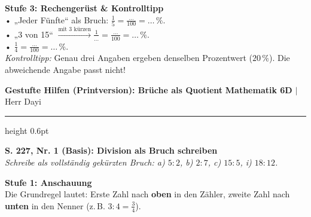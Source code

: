 \documentclass[a4paper,10pt]{article}
\begin{document}
\begin{tcolorbox}[colback=step3Bg, colframe=step3Border, arc=1.8mm, boxrule=0.7pt, left=3mm, right=3mm, top=1.8mm, bottom=1.8mm]
    {\color{step3Text}\small\bfseries\faCheckSquare\enskip Stufe 3: Rechengerüst \& Kontrolltipp}\\[1mm]
    {\footnotesize
    • „Jeder Fünfte“ als Bruch: $\frac{1}{5} = \frac{\dots}{100} = \dots\,\%$.\\
    • „3 von 15“ $\xrightarrow{\text{mit 3 kürzen}} \frac{1}{\dots} = \frac{\dots}{100} = \dots\,\%$.\\
    • $\frac{1}{4} = \frac{\dots}{100} = \dots\,\%$.\\[1mm]
    \textit{Kontrolltipp:} Genau drei Angaben ergeben denselben Prozentwert ($20\,\%$). Die abweichende Angabe passt nicht!}
\end{tcolorbox}

\newpage


\noindent
{\color{primaryBlue}\bfseries\normalsize \faDivide\enskip Gestufte Hilfen (Printversion): Brüche als Quotient}
\hfill
{\footnotesize\color{primaryBlue!80} \textbf{Mathematik 6D} \quad$|$\quad Herr Dayi}
\vspace{1.5mm}
{\color{primaryBlue!40}\hrule height 0.6pt}
\vspace{2.5mm}

\begin{tcolorbox}[enhanced, colback=lvlGreen!5, colframe=lvlGreen!50, arc=2mm, boxrule=0.8pt, left=3mm, right=3mm, top=2mm, bottom=2mm]
    {\bfseries\color{lvlGreen} \faStar\enskip S. 227, Nr. 1 (Basis): Division als Bruch schreiben}\\[1mm]
    {\footnotesize\textit{Schreibe als vollständig gekürzten Bruch: a) $5 : 2$, b) $2 : 7$, c) $15 : 5$, i) $18 : 12$.}}
\end{tcolorbox}

\vspace{1.5mm}

\begin{tcolorbox}[colback=step1Bg, colframe=step1Border, arc=1.8mm, boxrule=0.7pt, left=3mm, right=3mm, top=1.8mm, bottom=1.8mm]
    {\color{step1Text}\small\bfseries\faEye\enskip Stufe 1: Anschauung}\\[1mm]
    {\footnotesize Die Grundregel lautet: Erste Zahl nach \textbf{oben} in den Zähler, zweite Zahl nach \textbf{unten} in den Nenner (z.\,B. $3 : 4 = \frac{3}{4}$).}
\end{tcolorbox}
\end{document}
